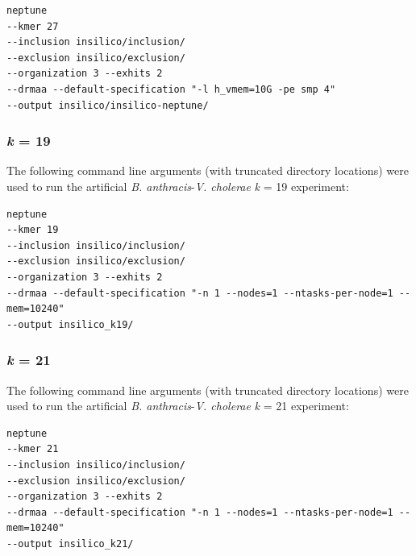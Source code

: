 \documentclass[a4paper,10pt]{article}
\begin{document}
\begin{verbatim}
neptune
--kmer 27
--inclusion insilico/inclusion/
--exclusion insilico/exclusion/
--organization 3 --exhits 2
--drmaa --default-specification "-l h_vmem=10G -pe smp 4"
--output insilico/insilico-neptune/
\end{verbatim}

\subsubsection*{\textit{k} = 19}

The following command line arguments (with truncated directory locations) were used to run the artificial \textit{B. anthracis}-\textit{V. cholerae} \textit{k} = 19 experiment:

\begin{verbatim}
neptune
--kmer 19
--inclusion insilico/inclusion/
--exclusion insilico/exclusion/
--organization 3 --exhits 2
--drmaa --default-specification "-n 1 --nodes=1 --ntasks-per-node=1 --mem=10240"
--output insilico_k19/
\end{verbatim}

\subsubsection*{\textit{k} = 21}

The following command line arguments (with truncated directory locations) were used to run the artificial \textit{B. anthracis}-\textit{V. cholerae} \textit{k} = 21 experiment:

\begin{verbatim}
neptune
--kmer 21
--inclusion insilico/inclusion/
--exclusion insilico/exclusion/
--organization 3 --exhits 2
--drmaa --default-specification "-n 1 --nodes=1 --ntasks-per-node=1 --mem=10240"
--output insilico_k21/
\end{verbatim}
\end{document}
